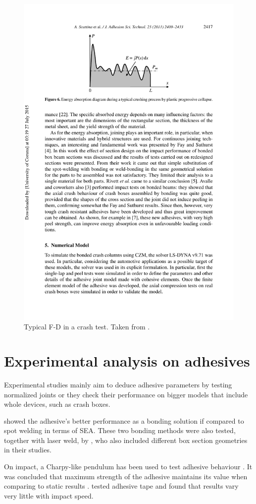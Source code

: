 \documentclass[
documentsize = a4, %
font = cmr, %
typesize = 11, %
printmode = true,
onehalfspacing = true,
language = en, %
titlepage = udciccp, %
degree = pt, %
dedication = true,
acknowledgements = true,
abstract-en = true,
abstract-es = false,
abstract-ga = false,
epigraphs = true,
toc = true,
lof = true,
lot = true,
frontmatterintoc = false,
notation = false,
minimal = false,
]{UDCthesis}
\begin{document}
\begin{figure}
	\centering
	\includegraphics[width=0.7\linewidth]{IMG_CUTRES/f-d}
	\caption[Typical \acrlong{F-D} in a crash test.]{Typical \acrlong{F-D} in a crash test. Taken from \citet{Scattina2011}.}
	\label{fig:f-d}
\end{figure}

\section{Experimental analysis on adhesives}

Experimental studies mainly aim to deduce adhesive parameters by testing normalized joints or they check their performance on bigger models that include whole devices, such as crash boxes.

\citet{Lee2006} showed the adhesive's better performance as a bonding solution if compared to spot welding in terms of \gls{SEA}. These two bonding methods were also tested, together with laser weld, by \citet{Peroni2009}, who also included different box section geometries in their studies.

On impact, a Charpy-like pendulum has been used to test adhesive behaviour \citep{Goglio2008, Kadioglu2014}. It was concluded that maximum strength of the adhesive maintains its value when comparing to static results \citep{Goglio2008}. \citet{Kadioglu2014} tested adhesive tape and found that results vary very little with impact speed.
\end{document}
